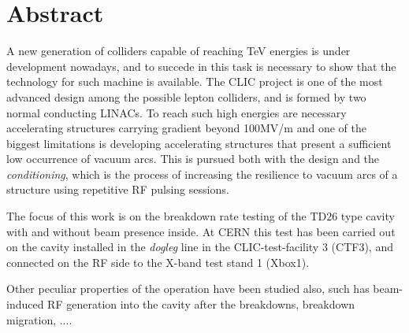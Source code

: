 \chapter*{Abstract}

A new generation of colliders capable of reaching TeV energies is under development nowadays, and to succede in this task is necessary to show that the technology for such machine is available. The CLIC project is one of the most advanced design among the possible lepton colliders, and is formed by two normal conducting LINACs. To reach such high energies are necessary accelerating structures carrying gradient beyond 100MV/m and one of the biggest limitations is developing accelerating structures that present a sufficient low occurrence of vacuum arcs. This is pursued both with the design and the \textit{conditioning}, which is the process of increasing the resilience to vacuum arcs of a structure using repetitive RF pulsing sessions. 

The focus of this work is on the breakdown rate testing of the TD26 type cavity with and without beam presence inside. At CERN this test has been carried out on the cavity installed in the \textit{dogleg} line in the CLIC-test-facility 3 (CTF3), and connected on the RF side to the X-band test stand 1 (Xbox1).

Other peculiar properties of the operation have been studied also, such has beam-induced RF generation into the cavity after the breakdowns, breakdown migration, ....